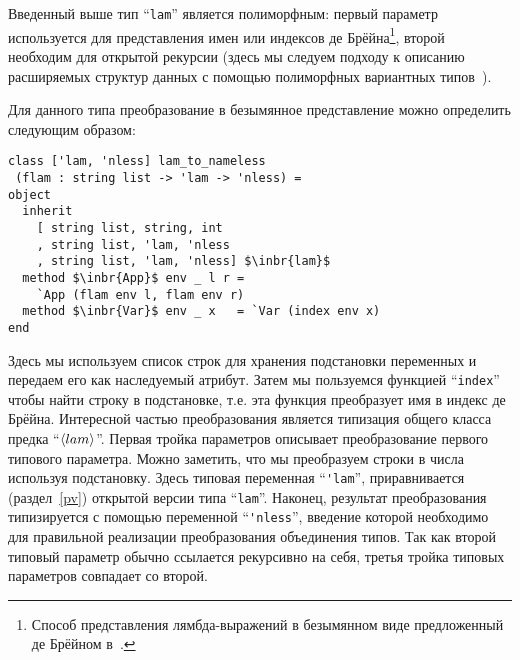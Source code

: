 Введенный выше тип ``\lstinline{lam}'' является полиморфным: первый параметр используется для представления имен или индексов %
де Брёйна\footnote{Способ представления лямбда-выражений в безымянном виде предложенный де Брёйном в~\cite{deBruijn}.}, второй необходим для открытой рекурсии (здесь мы следуем  подходу к описанию расширяемых структур данных с помощью полиморфных 
вариантных типов~\cite{PolyVarReuse}).

Для данного типа преобразование в безымянное представление можно определить следующим образом:

\begin{lstlisting}
class ['lam, 'nless] lam_to_nameless
 (flam : string list -> 'lam -> 'nless) =
object
  inherit 
    [ string list, string, int
    , string list, 'lam, 'nless
    , string list, 'lam, 'nless] $\inbr{lam}$
  method $\inbr{App}$ env _ l r = 
    `App (flam env l, flam env r)
  method $\inbr{Var}$ env _ x   = `Var (index env x)
end
\end{lstlisting}


\noindent Здесь мы используем список строк для хранения подстановки переменных и  передаем его как наследуемый атрибут. Затем мы пользуемся функцией 
``\lstinline{index}'' чтобы найти строку в подстановке, т.е.  эта функция преобразует имя в индекс де Брёйна. 
Интересной частью преобразования является типизация общего класса предка ``$\left<lam\right>$''. 
Первая тройка параметров описывает преобразование первого типового параметра. Можно заметить, что мы преобразуем строки в числа используя подстановку.
Здесь типовая переменная ``\lstinline{'lam}'', 
приравнивается (раздел~\ref{pv}) открытой версии типа ``\lstinline{lam}''. %
Наконец, результат преобразования типизируется с помощью переменной ``\lstinline{'nless}'', введение которой необходимо для правильной реализации преобразования объединения типов.
Так как второй типовый параметр обычно ссылается рекурсивно на себя, третья тройка типовых параметров совпадает со второй.

